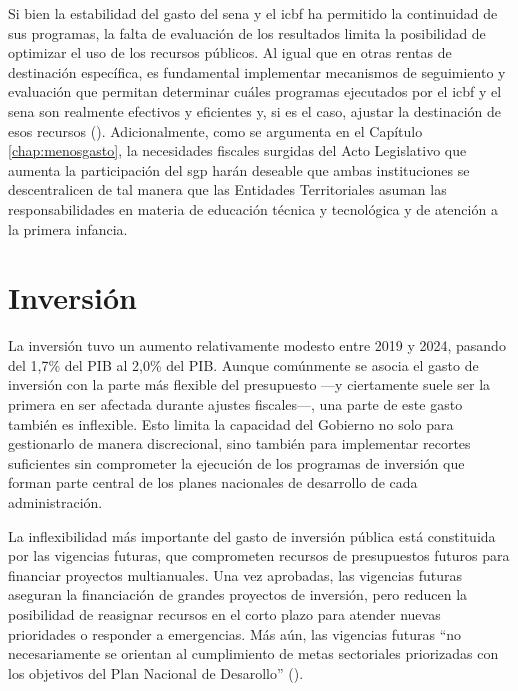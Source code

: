 Si bien la estabilidad del gasto del \gls{sena} y el \gls{icbf} ha permitido la continuidad de sus programas, la falta de evaluación de los resultados limita la posibilidad de optimizar el uso de los recursos públicos. Al igual que en otras rentas de destinación específica, es fundamental implementar mecanismos de seguimiento y evaluación que permitan determinar cuáles programas ejecutados por el \gls{icbf} y el \gls{sena} son realmente efectivos y eficientes y, si es el caso, ajustar la destinación de esos recursos (\cite{CONPES2022}). Adicionalmente, como se argumenta en el Capítulo \ref{chap:menosgasto}, la necesidades fiscales surgidas del Acto Legislativo que aumenta la participación del \gls{sgp} harán deseable que ambas instituciones se descentralicen de tal manera que las Entidades Territoriales asuman las responsabilidades en materia de educación técnica y tecnológica y de atención a la primera infancia.

\section{Inversión}

La inversión tuvo un aumento relativamente modesto entre 2019 y 2024, pasando del 1,7\% del PIB al 2,0\% del PIB. Aunque comúnmente se asocia el gasto de inversión con la parte más flexible del presupuesto —y ciertamente suele ser la primera en ser afectada durante ajustes fiscales—, una parte de este gasto también es inflexible. Esto limita la capacidad del Gobierno no solo para gestionarlo de manera discrecional, sino también para implementar recortes suficientes sin comprometer la ejecución de los programas de inversión que forman parte central de los planes nacionales de desarrollo de cada administración.

La inflexibilidad más importante del gasto de inversión pública está constituida por las vigencias futuras, que comprometen recursos de presupuestos futuros para financiar proyectos multianuales. Una vez aprobadas, las vigencias futuras aseguran la financiación de grandes proyectos de inversión, pero reducen la posibilidad de reasignar recursos en el corto plazo para atender nuevas prioridades o responder a emergencias. Más aún, las vigencias futuras ``no necesariamente se orientan al cumplimiento de metas sectoriales priorizadas con los objetivos del Plan Nacional de Desarollo'' (\cite{CONPES2022}). 



